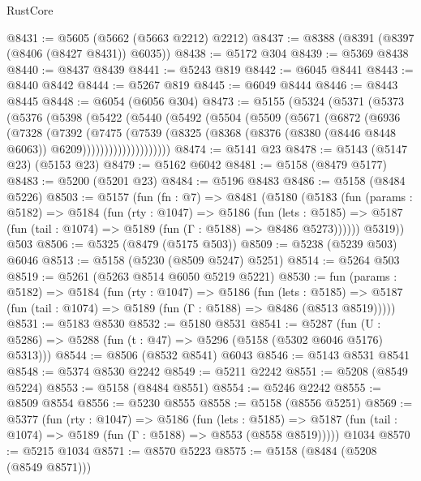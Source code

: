 \begin{lexlean}{RustCore}
\begin{coremodule}
@8431 := @5605 (@5662 (@5663 @2212) @2212)
@8437 := @8388 (@8391 (@8397 (@8406 (@8427 @8431)) @6035))
@8438 := @5172 @304
@8439 := @5369 @8438
@8440 := @8437 @8439
@8441 := @5243 @819
@8442 := @6045 @8441
@8443 := @8440 @8442
@8444 := @5267 @819
@8445 := @6049 @8444
@8446 := @8443 @8445
@8448 := @6054 (@6056 @304)
@8473 := @5155
    (@5324
      (@5371
        (@5373
          (@5376
            (@5398
              (@5422
                (@5440
                  (@5492
                    (@5504
                      (@5509
                        (@5671
                          (@6872
                            (@6936
                              (@7328
                                (@7392
                                  (@7475
                                    (@7539
                                      (@8325
                                        (@8368
                                          (@8376
                                            (@8380 (@8446 @8448 @6063))
                                            @6209))))))))))))))))))))
@8474 := @5141 @23
@8478 := @5143 (@5147 @23) (@5153 @23)
@8479 := @5162 @6042
@8481 := @5158 (@8479 @5177)
@8483 := @5200 (@5201 @23)
@8484 := @5196 @8483
@8486 := @5158 (@8484 @5226)
@8503 := @5157
    (fun (fn : @7) =>
    @8481
      (@5180
        (@5183
          (fun (params : @5182) =>
          @5184
            (fun (rty : @1047) =>
            @5186
              (fun (lets : @5185) =>
              @5187 (fun (tail : @1074) => @5189 (fun (Γ : @5188) => @8486 @5273))))))
        @5319))
    @503
@8506 := @5325 (@8479 (@5175 @503))
@8509 := @5238 (@5239 @503) @6046
@8513 := @5158 (@5230 (@8509 @5247) @5251)
@8514 := @5264 @503
@8519 := @5261 (@5263 @8514 @6050 @5219 @5221)
@8530 := fun (params : @5182) =>
  @5184
    (fun (rty : @1047) =>
    @5186
      (fun (lets : @5185) =>
      @5187 (fun (tail : @1074) => @5189 (fun (Γ : @5188) => @8486 (@8513 @8519)))))
@8531 := @5183 @8530
@8532 := @5180 @8531
@8541 := @5287 (fun (U : @5286) => @5288 (fun (t : @47) => @5296 (@5158 (@5302 @6046 @5176) @5313)))
@8544 := @8506 (@8532 @8541) @6043
@8546 := @5143 @8531 @8541
@8548 := @5374 @8530 @2242
@8549 := @5211 @2242
@8551 := @5208 (@8549 @5224)
@8553 := @5158 (@8484 @8551)
@8554 := @5246 @2242
@8555 := @8509 @8554
@8556 := @5230 @8555
@8558 := @5158 (@8556 @5251)
@8569 := @5377
    (fun (rty : @1047) =>
    @5186
      (fun (lets : @5185) =>
      @5187 (fun (tail : @1074) => @5189 (fun (Γ : @5188) => @8553 (@8558 @8519)))))
    @1034
@8570 := @5215 @1034
@8571 := @8570 @5223
@8575 := @5158 (@8484 (@5208 (@8549 @8571)))

\end{coremodule}
\end{lexlean}
